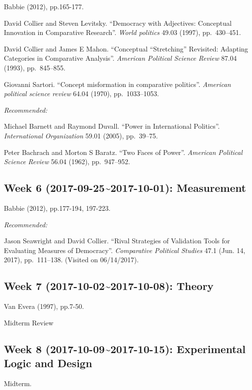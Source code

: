 \documentclass[11pt,]{article}
\begin{document}
Babbie (2012), pp.165-177.

David Collier and Steven Levitsky. ``Democracy with Adjectives:
Conceptual Innovation in Comparative Research''. \emph{World politics}
49.03 (1997), pp.~430--451.

David Collier and James E Mahon. ``Conceptual ``Stretching'' Revisited:
Adapting Categories in Comparative Analysis''.
\emph{American Political Science Review} 87.04 (1993), pp.~845--855.

Giovanni Sartori. ``Concept misformation in comparative politics''.
\emph{American political science review} 64.04 (1970), pp.~1033--1053.

\emph{Recommended:}

Michael Barnett and Raymond Duvall. ``Power in International Politics''.
\emph{International Organization} 59.01 (2005), pp.~39--75.

Peter Bachrach and Morton S Baratz. ``Two Faces of Power''.
\emph{American Political Science Review} 56.04 (1962), pp.~947--952.

\subsection{Week 6 (2017-09-25\textasciitilde{}2017-10-01):
Measurement}\label{week-6-2017-09-252017-10-01-measurement}

Babbie (2012), pp.177-194, 197-223.

\emph{Recommended:}

Jason Seawright and David Collier. ``Rival Strategies of Validation
Tools for Evaluating Measures of Democracy''.
\emph{Comparative Political Studies} 47.1 (Jun. 14, 2017), pp.~111--138.
(Visited on 06/14/2017).

\subsection{Week 7 (2017-10-02\textasciitilde{}2017-10-08):
Theory}\label{week-7-2017-10-022017-10-08-theory}

Van Evera (1997), pp.7-50.

Midterm Review

\subsection{Week 8 (2017-10-09\textasciitilde{}2017-10-15): Experimental
Logic and
Design}\label{week-8-2017-10-092017-10-15-experimental-logic-and-design}

Midterm.
\end{document}
